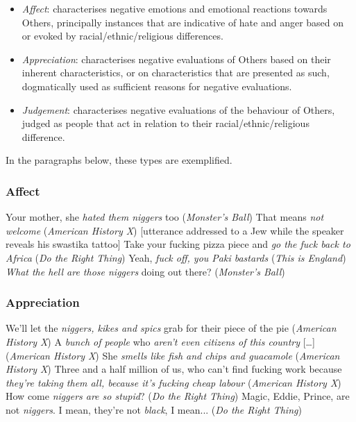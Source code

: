 \documentclass[output=paper]{LSP/langsci}
\begin{document}
\begin{itemize}
\item \textit{Affect}: characterises negative emotions and emotional reactions towards Others, principally instances that are indicative of hate and anger based on or evoked by racial/ethnic/religious differences.
\item \textit{Appreciation}: characterises negative evaluations of Others based on their inherent characteristics, or on characteristics that are presented as such, dogmatically used as sufficient reasons for negative evaluations.
\item \textit{Judgement}: characterises negative evaluations of the behaviour  of Others, judged as people that act in relation to their racial/ethnic/religious difference.
\end{itemize}

In the paragraphs below, these types are exemplified.

\subsubsection{Affect}

\ea \label{ex:2:1} Your mother, she \emph{hated them niggers} too (\textit{Monster's Ball})
\z
\ea \label{ex:2:2} That means \emph{not welcome} (\textit{American History X}) [utterance addressed to a Jew while the speaker reveals his swastika tattoo]
\z
\ea \label{ex:2:3} Take your fucking pizza piece and \emph{go the fuck back to Africa} (\textit{Do the Right Thing})
\z
\ea \label{ex:2:4} Yeah, \emph{fuck off, you Paki bastards} (\textit{This is England})
\z
\ea \label{ex:2:5} \emph{What the hell are those niggers} doing out there? (\textit{Monster's Ball})
\z

\subsubsection{Appreciation}

\ea \label{ex:2:6} We'll let the \emph{niggers, kikes and spics} grab for their piece of the pie (\textit{American History X})
\z
\ea \label{ex:2:7} A \textit{bunch of people} who \emph{aren't even citizens of this country} [{\dots}] (\textit{American History X})
\z
\ea \label{ex:2:8} She \emph{smells like fish and chips and guacamole} (\textit{American History X})
\z
\ea \label{ex:2:9} Three and a half million of us, who can't find fucking work because \emph{they're taking them all, because it's fucking cheap labour} (\textit{American History X})
\z
\ea \label{ex:2:10} How come \emph{niggers are so stupid}? (\textit{Do the Right Thing})
\z
\ea \label{ex:2:11} Magic, Eddie, Prince, are not \emph{niggers}. I mean, they're not \emph{black}, I mean... (\textit{Do the Right Thing})
\z
\end{document}
